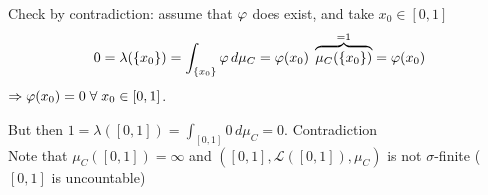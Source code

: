 Check by contradiction: assume that \(\oldphi \) does exist, and take \(x_0 \in \left[0, 1\right]\)
\[ 
    0 = \lambda (\left\{x_0\right\}) = \int_{\left\{x_0\right\}} \oldphi \, d\mu_C = \oldphi (x_0) \; \overbrace{\mu_C (\left\{x_0\right\})}^{=1}= \oldphi (x_0)
\]
\(\Rightarrow \oldphi (x_0) = 0 \; \forall \; x_0 \in \left[0, 1\right]\).

But then \(1 = \lambda(\left[0, 1\right]) = \int_{\left[0, 1\right]} 0 \, d\mu_C = 0\). Contradiction \\
Note that \(\mu_C (\left[0, 1\right]) = \infty \) and \(\left( \left[0,1\right], \mathcal{L}(\left[0, 1\right]), \mu_C\right)\) is not \(\sigma\)-finite (\(\left[0,1\right]\) is uncountable)



